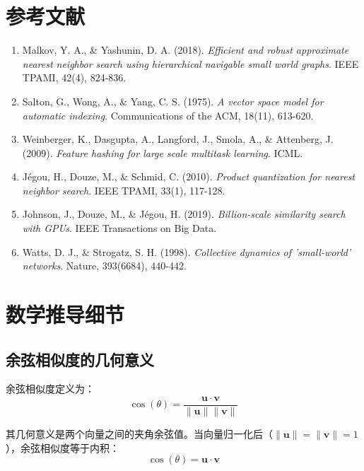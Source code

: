 \documentclass[12pt,a4paper]{article}
\begin{document}
\section*{参考文献}

\begin{enumerate}
    \item Malkov, Y. A., \& Yashunin, D. A. (2018). \textit{Efficient and robust approximate nearest neighbor search using hierarchical navigable small world graphs}. IEEE TPAMI, 42(4), 824-836.

    \item Salton, G., Wong, A., \& Yang, C. S. (1975). \textit{A vector space model for automatic indexing}. Communications of the ACM, 18(11), 613-620.

    \item Weinberger, K., Dasgupta, A., Langford, J., Smola, A., \& Attenberg, J. (2009). \textit{Feature hashing for large scale multitask learning}. ICML.

    \item Jégou, H., Douze, M., \& Schmid, C. (2010). \textit{Product quantization for nearest neighbor search}. IEEE TPAMI, 33(1), 117-128.

    \item Johnson, J., Douze, M., \& Jégou, H. (2019). \textit{Billion-scale similarity search with GPUs}. IEEE Transactions on Big Data.

    \item Watts, D. J., \& Strogatz, S. H. (1998). \textit{Collective dynamics of 'small-world' networks}. Nature, 393(6684), 440-442.
\end{enumerate}

\appendix

\section{数学推导细节}

\subsection{余弦相似度的几何意义}

余弦相似度定义为：
\begin{equation}
\cos(\theta) = \frac{\mathbf{u} \cdot \mathbf{v}}{\|\mathbf{u}\| \|\mathbf{v}\|}
\end{equation}

其几何意义是两个向量之间的夹角余弦值。当向量归一化后（$\|\mathbf{u}\| = \|\mathbf{v}\| = 1$），余弦相似度等于内积：
\begin{equation}
\cos(\theta) = \mathbf{u} \cdot \mathbf{v}
\end{equation}
\end{document}
